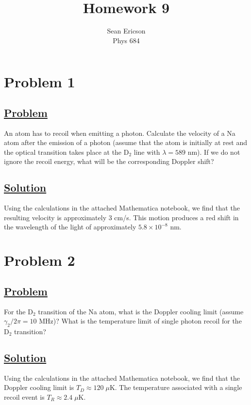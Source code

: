 \documentclass[12pt]{article}
\begin{document}
	
\title{Homework 9}
\author{Sean Ericson \\ Phys 684}
\maketitle

\section*{Problem 1}
\subsection*{\small\underline{Problem}}
An atom has to recoil when emitting a photon. 
Calculate the velocity of a Na atom after the emission of a photon (assume that the atom is initially at rest and the optical transition takes place at the $\text{D}_2$ line with $\lambda = 589$ nm).
If we do not ignore the recoil energy, what will be the corresponding Doppler shift?

\subsection*{\small\underline{Solution}}
Using the calculations in the attached Mathematica notebook, we find that the resulting velocity is approximately 3 cm/s.
This motion produces a red shift in the wavelength of the light of approximately $5.8\times10^{-8}$ nm.

\section*{Problem 2}
\subsection*{\small\underline{Problem}}
For the $\text{D}_2$ transition of the Na atom, what is the Doppler cooling limit (assume $\gamma_2/2\pi=10$ MHz)?
What is the temperature limit of single photon recoil for the $\text{D}_2$ transition?

\subsection*{\small\underline{Solution}}
Using the calculations in the attached Mathematica notebook, we find that the Doppler cooling limit is $T_D \approx 120\;\mu$K. The temperature associated with a single recoil event is $T_R \approx 2.4\;\mu$K.
\end{document}
